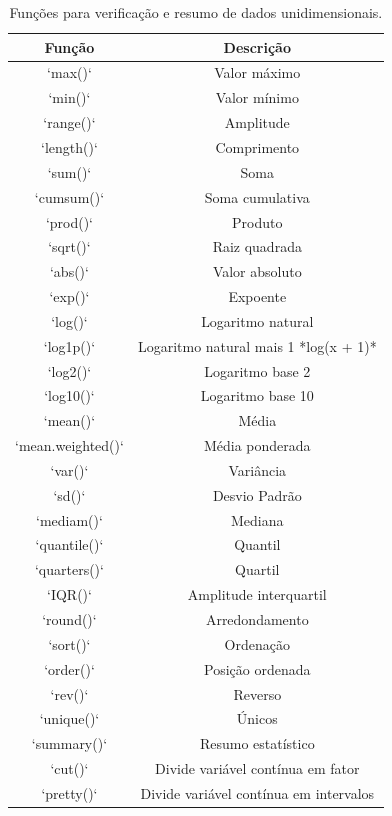 \documentclass[
]{book}
\begin{document}
\begin{table}

\caption{\label{tab:tab-tab-funcoes-conf-uni}Funções para verificação e resumo de dados unidimensionais.}
\centering
\begin{tabular}[t]{c|c}
\hline
Função & Descrição\\
\hline
`max()` & Valor máximo\\
\hline
`min()` & Valor mínimo\\
\hline
`range()` & Amplitude\\
\hline
`length()` & Comprimento\\
\hline
`sum()` & Soma\\
\hline
`cumsum()` & Soma cumulativa\\
\hline
`prod()` & Produto\\
\hline
`sqrt()` & Raiz quadrada\\
\hline
`abs()` & Valor absoluto\\
\hline
`exp()` & Expoente\\
\hline
`log()` & Logaritmo natural\\
\hline
`log1p()` & Logaritmo natural mais 1 *log(x + 1)*\\
\hline
`log2()` & Logaritmo base 2\\
\hline
`log10()` & Logaritmo base 10\\
\hline
`mean()` & Média\\
\hline
`mean.weighted()` & Média ponderada\\
\hline
`var()` & Variância\\
\hline
`sd()` & Desvio Padrão\\
\hline
`mediam()` & Mediana\\
\hline
`quantile()` & Quantil\\
\hline
`quarters()` & Quartil\\
\hline
`IQR()` & Amplitude interquartil\\
\hline
`round()` & Arredondamento\\
\hline
`sort()` & Ordenação\\
\hline
`order()` & Posição ordenada\\
\hline
`rev()` & Reverso\\
\hline
`unique()` & Únicos\\
\hline
`summary()` & Resumo estatístico\\
\hline
`cut()` & Divide variável contínua em fator\\
\hline
`pretty()` & Divide variável contínua em intervalos\\

\end{tabular}
\end{table}
\end{document}
